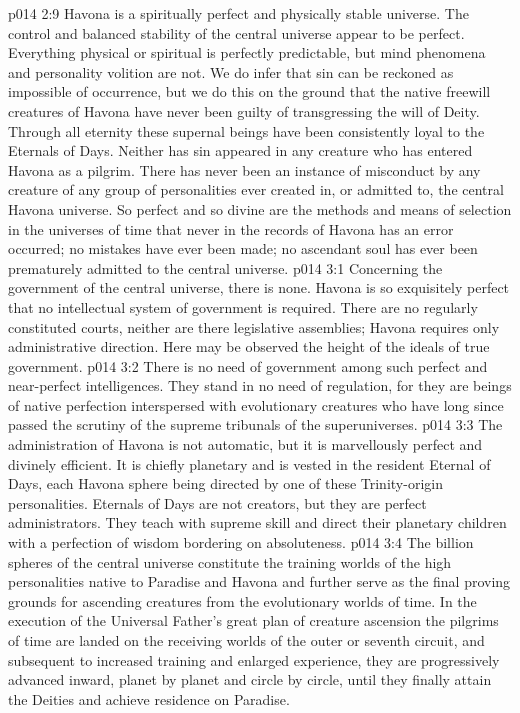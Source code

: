 \vs p014 2:9 \pc Havona is a spiritually perfect and physically stable universe. The control and balanced stability of the central universe appear to be perfect. Everything physical or spiritual is perfectly predictable, but mind phenomena and personality volition are not. We do infer that sin can be reckoned as impossible of occurrence, but we do this on the ground that the native freewill creatures of Havona have never been guilty of transgressing the will of Deity. Through all eternity these supernal beings have been consistently loyal to the Eternals of Days. Neither has sin appeared in any creature who has entered Havona as a pilgrim. There has never been an instance of misconduct by any creature of any group of personalities ever created in, or admitted to, the central Havona universe. So perfect and so divine are the methods and means of selection in the universes of time that never in the records of Havona has an error occurred; no mistakes have ever been made; no ascendant soul has ever been prematurely admitted to the central universe.
\vs p014 3:1 Concerning the government of the central universe, there is none. Havona is so exquisitely perfect that no intellectual system of government is required. There are no regularly constituted courts, neither are there legislative assemblies; Havona requires only administrative direction. Here may be observed the height of the ideals of true government.
\vs p014 3:2 There is no need of government among such perfect and near\hyp{}perfect intelligences. They stand in no need of regulation, for they are beings of native perfection interspersed with evolutionary creatures who have long since passed the scrutiny of the supreme tribunals of the superuniverses.
\vs p014 3:3 The administration of Havona is not automatic, but it is marvellously perfect and divinely efficient. It is chiefly planetary and is vested in the resident Eternal of Days, each Havona sphere being directed by one of these Trinity\hyp{}origin personalities. Eternals of Days are not creators, but they are perfect administrators. They teach with supreme skill and direct their planetary children with a perfection of wisdom bordering on absoluteness.
\vs p014 3:4 The billion spheres of the central universe constitute the training worlds of the high personalities native to Paradise and Havona and further serve as the final proving grounds for ascending creatures from the evolutionary worlds of time. In the execution of the Universal Father’s great plan of creature ascension the pilgrims of time are landed on the receiving worlds of the outer or seventh circuit, and subsequent to increased training and enlarged experience, they are progressively advanced inward, planet by planet and circle by circle, until they finally attain the Deities and achieve residence on Paradise.
